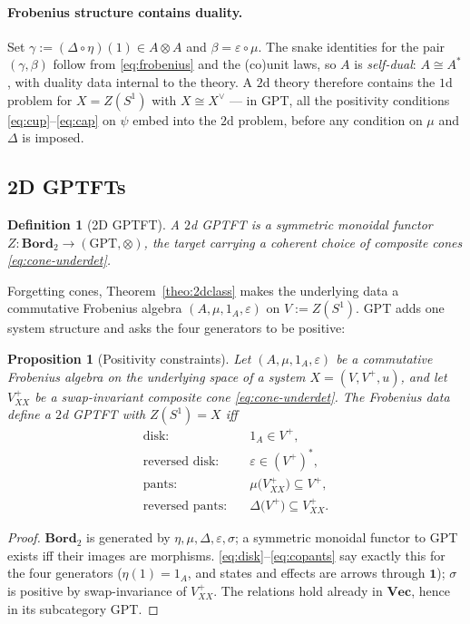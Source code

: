 \documentclass[prl,aps,10pt,superscriptaddress, floatfix]{revtex4-2}
\newtheorem{prop}{Proposition}
\newtheorem*{defi}{Definition}
\begin{document}
\paragraph{Frobenius structure contains duality.}
Set $\gamma:=(\Delta\circ\eta)(1)\in A\otimes A$ and $\beta=\varepsilon\circ\mu$. The snake identities for the pair $(\gamma,\beta)$ follow from \eqref{eq:frobenius} and the (co)unit laws, so $A$ is \emph{self-dual}: $A\cong A^*$, with duality data internal to the theory. A $2$d theory therefore contains the $1$d problem for $X=Z(S^1)$ with $X\cong X^\vee$ --- in GPT, all the positivity conditions \eqref{eq:cup}--\eqref{eq:cap} on $\psi$ embed into the $2$d problem, before any condition on $\mu$ and $\Delta$ is imposed.

\subsection{2D GPTFTs}

\begin{defi}[2D GPTFT]
A \emph{$2$d GPTFT} is a symmetric monoidal functor $Z:\mathbf{Bord}_2\to(\mathrm{GPT},\otimes)$, the target carrying a coherent choice of composite cones \eqref{eq:cone-underdet}.
\end{defi}

Forgetting cones, Theorem~\ref{theo:2dclass} makes the underlying data a commutative Frobenius algebra $(A,\mu,1_A,\varepsilon)$ on $V:=Z(S^1)$. GPT adds one system structure and asks the four generators to be positive:

\begin{prop}[Positivity constraints]\label{prop:2dpos}
Let $(A,\mu,1_A,\varepsilon)$ be a commutative Frobenius algebra on the underlying space of a system $X=(V,V^+,u)$, and let $V^+_{XX}$ be a swap-invariant composite cone \eqref{eq:cone-underdet}. The Frobenius data define a $2$d GPTFT with $Z(S^1)=X$ iff
\begin{align}
\text{disk:}&\quad 1_A\in V^+,\label{eq:disk}\\
\text{reversed disk:}&\quad \varepsilon\in(V^+)^*,\label{eq:codisk}\\
\text{pants:}&\quad \mu\big(V^+_{XX}\big)\subseteq V^+,\label{eq:pants}\\
\text{reversed pants:}&\quad \Delta\big(V^+\big)\subseteq V^+_{XX}.\label{eq:copants}
\end{align}
\end{prop}

\begin{proof}
$\mathbf{Bord}_2$ is generated by $\eta,\mu,\Delta,\varepsilon,\sigma$; a symmetric monoidal functor to GPT exists iff their images are morphisms. \eqref{eq:disk}--\eqref{eq:copants} say exactly this for the four generators ($\eta(1)=1_A$, and states and effects are arrows through $\mathbf 1$); $\sigma$ is positive by swap-invariance of $V^+_{XX}$. The relations hold already in $\mathbf{Vec}$, hence in its subcategory GPT.
\end{proof}
\end{document}

